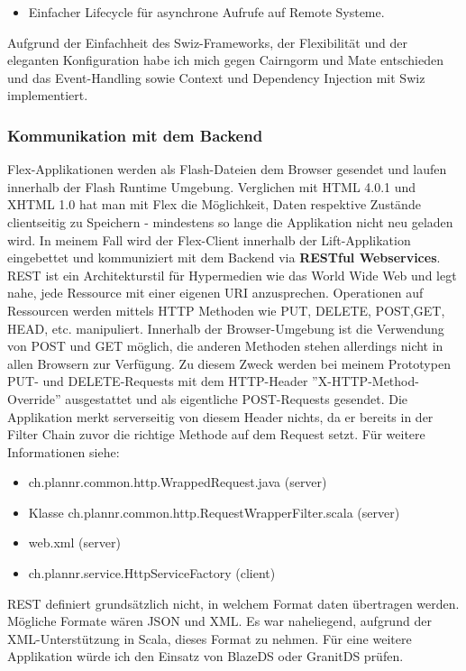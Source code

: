 \begin{itemize}
\begin{itemize}
\begin{lstlisting}[caption=Swiz: Event Observer]
[Mediate( event="Events.SEARCH_USERS", 
          properties="term" )]
public function searchUsers( term:String) : void
{
//...
}
\end{lstlisting}
Hier wird das Property term des geworfenen Events zus\"atzlich der Methode als Argument \"ubergeben.
\item Einfacher Lifecycle f\"ur asynchrone Aufrufe auf Remote Systeme.
\end{itemize}
\end{itemize}

Aufgrund der Einfachheit des Swiz-Frameworks, der Flexibilit\"at und der eleganten Konfiguration habe ich mich gegen Cairngorm und Mate entschieden und das Event-Handling sowie Context und Dependency Injection mit Swiz implementiert.

\subsubsection{Kommunikation mit dem Backend}
Flex-Applikationen werden als Flash-Dateien dem Browser gesendet und laufen innerhalb der Flash Runtime Umgebung. Verglichen mit HTML 4.0.1 und XHTML 1.0 hat man mit Flex die M\"oglichkeit, Daten respektive Zust\"ande clientseitig zu Speichern - mindestens so lange die Applikation nicht neu geladen wird.
In meinem Fall wird der Flex-Client innerhalb der Lift-Applikation eingebettet und kommuniziert mit dem Backend via \textbf{RESTful Webservices}. REST ist ein Architekturstil f\"ur Hypermedien wie das World Wide Web und legt nahe, jede Ressource mit einer eigenen URI anzusprechen. Operationen auf Ressourcen werden mittels HTTP Methoden  wie PUT, DELETE, POST,GET, HEAD, etc. manipuliert\cite{wiki:rest}. Innerhalb der Browser-Umgebung ist die Verwendung von POST und GET m\"oglich, die anderen Methoden stehen allerdings nicht in allen Browsern zur Verf\"ugung. Zu diesem Zweck werden bei meinem Prototypen PUT- und DELETE-Requests mit dem HTTP-Header  ''X-HTTP-Method-Override'' ausgestattet und als eigentliche POST-Requests gesendet. Die Applikation merkt serverseitig von diesem Header nichts, da er bereits in der Filter Chain zuvor die richtige Methode auf dem Request setzt. F\"ur weitere Informationen siehe:
\begin{itemize}
\item ch.plannr.common.http.WrappedRequest.java (server)
\item Klasse ch.plannr.common.http.RequestWrapperFilter.scala (server)
\item web.xml (server)
\item ch.plannr.service.HttpServiceFactory (client)
\end{itemize}
REST definiert grunds\"atzlich nicht, in welchem Format daten \"ubertragen werden.  M\"ogliche Formate w\"aren JSON und XML. Es war naheliegend, aufgrund der XML-Unterst\"utzung in Scala, dieses Format zu nehmen. F\"ur eine weitere Applikation w\"urde ich den Einsatz von BlazeDS\cite{blazeDs}\cite{IntegratingBlazeDsLiftweb} oder GranitDS\cite{graniteDs} pr\"ufen.

